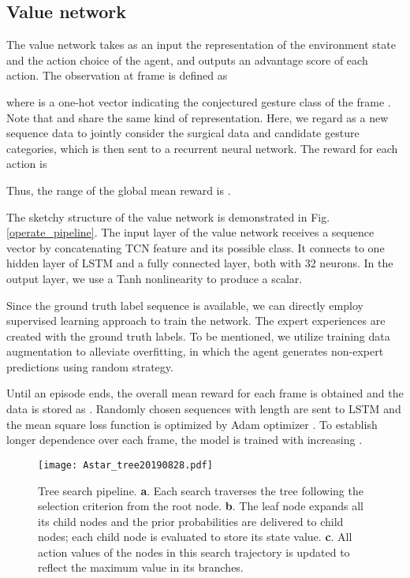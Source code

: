 \documentclass[letterpaper, 10 pt, conference]{ieeeconf}
\begin{document}
\subsection{Value network}
The value network takes as an input the representation of the environment state and the action choice of the agent, and outputs an advantage score of each action. The observation at frame  is defined as

where  is a one-hot vector indicating the conjectured gesture class of the frame . Note that  and  share the same kind of representation. Here, we regard  as a new sequence data to jointly consider the surgical data and candidate gesture categories, which is then sent to a recurrent neural network. The reward for each action is 

Thus, the range of the global mean reward is .

The sketchy structure of the value network is demonstrated in Fig. \ref{operate_pipeline}. The input layer of the value network receives a sequence vector by concatenating TCN feature and its possible class. It connects to one hidden layer of LSTM and a fully connected layer, both with 32 neurons. In the output layer, we use a Tanh nonlinearity to produce a scalar.

Since the ground truth label sequence is available, we can directly employ supervised learning approach to train the network. The expert experiences are created with the ground truth labels. To be mentioned, we utilize training data augmentation to alleviate overfitting, in which the agent generates non-expert predictions using random strategy. 

Until an episode ends, the overall mean reward  for each frame  is obtained and the data is stored as . Randomly chosen sequences with length  are sent to LSTM \cite{jin2017sv} and the mean square loss function is optimized by Adam optimizer \cite{kingma2014adam}. To establish longer dependence over each frame, the model is trained with increasing  \cite{michalski2014modeling}.


\begin{figure*}[t]
\centering
\texttt{[image: Astar\_tree20190828.pdf]}
	\caption{Tree search pipeline. \textbf a. Each search traverses the tree following the selection criterion from the root node. \textbf b. The leaf node  expands all its child nodes and the prior probabilities are delivered to child nodes; each child node is evaluated to store its state value. \textbf c. All action values of the nodes in this search trajectory is updated to reflect the maximum value in its branches.}
	\label{aTreeSearch}
	\vspace{-3mm}
\end{figure*}
\end{document}
